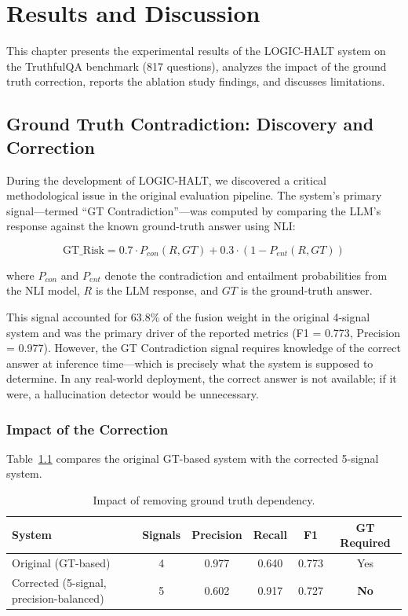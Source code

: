 \chapter{Results and Discussion}

This chapter presents the experimental results of the LOGIC-HALT system on the TruthfulQA benchmark (817 questions), analyzes the impact of the ground truth correction, reports the ablation study findings, and discusses limitations.

\section{Ground Truth Contradiction: Discovery and Correction}

During the development of LOGIC-HALT, we discovered a critical methodological issue in the original evaluation pipeline. The system's primary signal---termed ``GT Contradiction''---was computed by comparing the LLM's response against the known ground-truth answer using NLI:

\begin{equation}
    \text{GT\_Risk} = 0.7 \cdot P_{con}(R, GT) + 0.3 \cdot (1 - P_{ent}(R, GT))
\end{equation}

where $P_{con}$ and $P_{ent}$ denote the contradiction and entailment probabilities from the NLI model, $R$ is the LLM response, and $GT$ is the ground-truth answer.

This signal accounted for 63.8\% of the fusion weight in the original 4-signal system and was the primary driver of the reported metrics (F1 = 0.773, Precision = 0.977). However, the GT Contradiction signal requires knowledge of the correct answer at inference time---which is precisely what the system is supposed to determine. In any real-world deployment, the correct answer is not available; if it were, a hallucination detector would be unnecessary.

\subsection{Impact of the Correction}

Table~\ref{tab:gt_correction} compares the original GT-based system with the corrected 5-signal system.

\begin{table}[!htbp]
    \centering
    \caption{Impact of removing ground truth dependency.}
    \label{tab:gt_correction}
    \begin{tabular}{lccccc}
        \toprule
        System & Signals & Precision & Recall & F1 & GT Required \\
        \midrule
        Original (GT-based) & 4 & 0.977 & 0.640 & 0.773 & Yes \\
        Corrected (5-signal, precision-balanced) & 5 & 0.602 & 0.917 & 0.727 & \textbf{No} \\
        \bottomrule
    \end{tabular}
\end{table}

